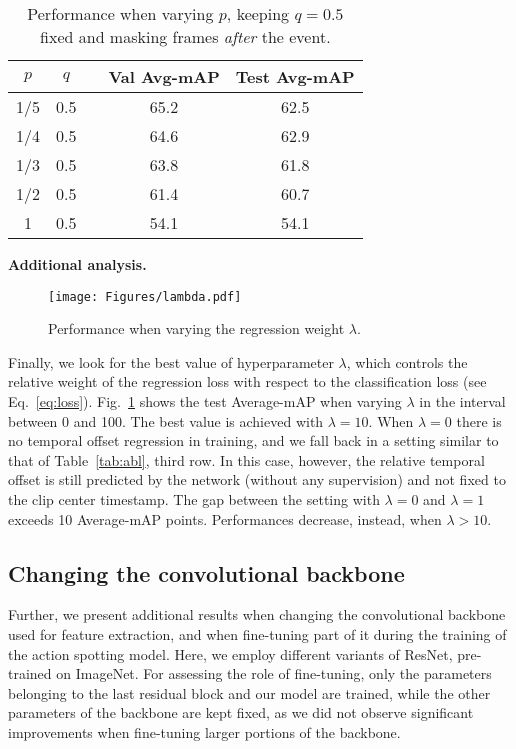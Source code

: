 \documentclass[a4paper,conference]{IEEEtran}
\newcommand{\tit}[1]{\smallbreak\noindent\textbf{#1.}}
\begin{document}
\begin{table}[t]
\centering
\caption{Performance when varying $p$, keeping $q=0.5$ fixed and masking frames \textit{after} the event.}
\begin{tabular}{ccccc}
    \toprule 
    $p$ & $q$ & & Val Avg-mAP & Test Avg-mAP \\
    \midrule
    1/5 & 0.5 & & 65.2 & 62.5 \\
    1/4 & 0.5 & & 64.6 & 62.9 \\
    1/3 & 0.5 & & 63.8 & 61.8 \\
    1/2 & 0.5 & & 61.4 & 60.7 \\
    1 & 0.5 & & 54.1 & 54.1 \\
    \bottomrule
\end{tabular}
\label{tab:mask_after}
\end{table}

\tit{Additional analysis}
\begin{figure}[t]
\centering
\texttt{[image: Figures/lambda.pdf]}
\caption{Performance when varying the regression weight $\lambda$.}
\label{fig:lambda}
\end{figure}
Finally, we look for the best value of hyperparameter $\lambda$, which controls the relative weight of the regression loss with respect to the classification loss (see Eq.~\ref{eq:loss}). Fig.~\ref{fig:lambda} shows the test Average-mAP when varying $\lambda$ in the interval between 0 and 100. The best value is achieved with $\lambda=10$. When $\lambda=0$ there is no temporal offset regression in training, and we fall back in a setting similar to that of Table~\ref{tab:abl}, third row. In this case, however, the relative temporal offset is still predicted by the network (without any supervision) and not fixed to the clip center timestamp. The gap between the setting with $\lambda=0$ and $\lambda=1$ exceeds 10 Average-mAP points. Performances decrease, instead, when $\lambda>10$.

\subsection{Changing the convolutional backbone}
Further, we present additional results when changing the convolutional backbone used for feature extraction, and when fine-tuning part of it during the training of the action spotting model.
Here, we employ different variants of ResNet, pre-trained on ImageNet. For assessing the role of fine-tuning, only the parameters belonging to the last residual block and our model are trained, while the other parameters of the backbone are kept fixed, as we did not observe significant improvements when fine-tuning larger portions of the backbone.
\end{document}
